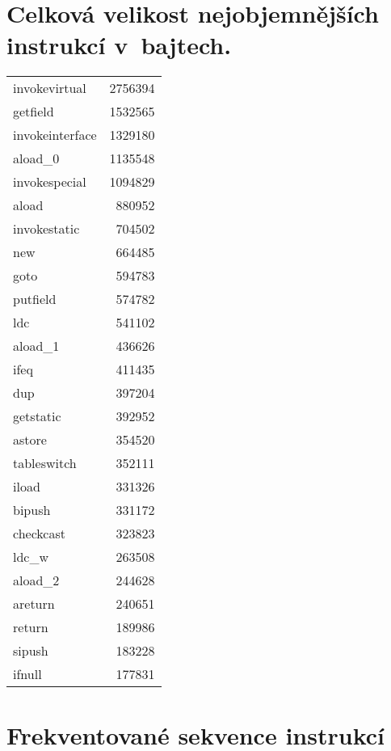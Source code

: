 \section{Celková velikost nejobjemnějších instrukcí v~bajtech.}\label{insts}

  \begin{tabular}{l r}
	invokevirtual	&	2756394	\\
	getfield	&	1532565	\\
	invokeinterface	&	1329180	\\
	aload\_0	&	1135548	\\
	invokespecial	&	1094829	\\
	aload	&	880952	\\
	invokestatic	&	704502	\\
	new	&	664485	\\
	goto	&	594783	\\
	putfield	&	574782	\\
	ldc	&	541102	\\
	aload\_1	&	436626	\\
	ifeq	&	411435	\\
	dup	&	397204	\\
	getstatic	&	392952	\\
	astore	&	354520	\\
	tableswitch	&	352111	\\
	iload	&	331326	\\
	bipush	&	331172	\\
	checkcast	&	323823	\\
	ldc\_w	&	263508	\\
	aload\_2	&	244628	\\
	areturn	&	240651	\\
	return	&	189986	\\
	sipush	&	183228	\\
	ifnull	&	177831
  \end{tabular}

\section{Frekventované sekvence instrukcí}\label{seq}

